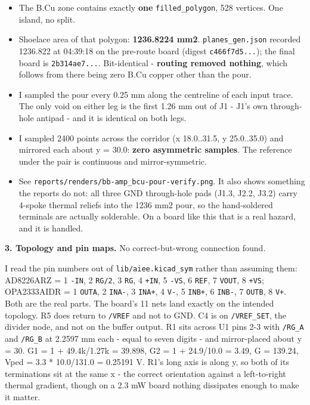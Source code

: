 \documentclass[11pt,a4paper]{article}
\begin{document}
\begin{itemize}
\item The B.Cu zone contains exactly \textbf{one} \texttt{filled\_polygon}, 528 vertices. One
island, no split.
\item Shoelace area of that polygon: \textbf{1236.8224 mm2}. \texttt{planes\_gen.json} recorded
1236.822 at 04:39:18 on the pre-route board (digest \texttt{c466f7d5...}); the final
board is \texttt{2b314ae7...}. Bit-identical - \textbf{routing removed nothing}, which
follows from there being zero B.Cu copper other than the pour.
\item I sampled the pour every 0.25 mm along the centreline of each input trace.
The only void on either leg is the first 1.26 mm out of J1 - J1's own
through-hole antipad - and it is identical on both legs.
\item I sampled 2400 points across the corridor (x 18.0..31.5, y 25.0..35.0) and
mirrored each about y = 30.0: \textbf{zero asymmetric samples}. The reference under
the pair is continuous and mirror-symmetric.
\item See \texttt{reports/renders/bb-amp\_bcu-pour-verify.png}. It also shows something the
reports do not: all three GND through-hole pads (J1.3, J2.2, J3.2) carry
4-spoke thermal reliefs into the 1236 mm2 pour, so the hand-soldered terminals
are actually solderable. On a board like this that is a real hazard, and it is
handled.
\end{itemize}
\textbf{3. Topology and pin maps.} No correct-but-wrong connection found.

I read the pin numbers out of \texttt{lib/aiee.kicad\_sym} rather than assuming them: AD8226ARZ = 1 \texttt{-IN}, 2 \texttt{RG/2}, 3 \texttt{RG}, 4 \texttt{+IN}, 5 \texttt{-VS}, 6 \texttt{REF}, 7 \texttt{VOUT}, 8 \texttt{+VS}; OPA2333AIDR = 1 \texttt{OUTA}, 2 \texttt{INA-}, 3 \texttt{INA+}, 4 \texttt{V-}, 5 \texttt{INB+}, 6 \texttt{INB-}, 7 \texttt{OUTB}, 8 \texttt{V+}. Both are the real parts. The board's 11 nets land exactly on the intended topology. R5 does return to \texttt{/VREF} and not to GND. C4 is on \texttt{/VREF\_SET}, the divider node, and not on the buffer output. R1 sits across U1 pins 2-3 with \texttt{/RG\_A} and \texttt{/RG\_B} at 2.2597 mm each - equal to seven digits - and mirror-placed about y = 30. G1 = 1 + 49.4k/1.27k = 39.898, G2 = 1 + 24.9/10.0 = 3.49, G = 139.24, Vped = 3.3 {*} 10.0/131.0 = 0.25191 V. R1's long axis is along y, so both of its terminations sit at the same x - the correct orientation against a left-to-right thermal gradient, though on a 2.3 mW board nothing dissipates enough to make it matter.
\end{document}
